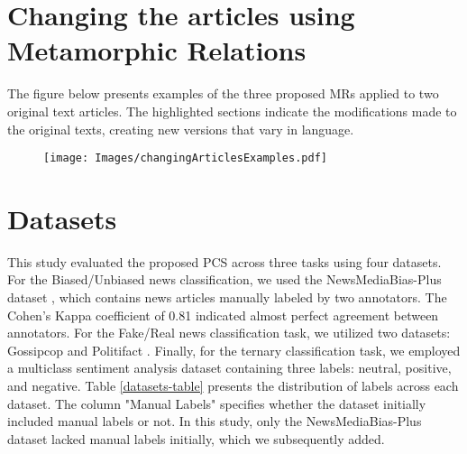 \newpage
\section{Changing the articles using Metamorphic Relations}
\label{fig:changing-articles}
The figure below presents examples of the three proposed MRs applied to two original text articles. The highlighted sections indicate the modifications made to the original texts, creating new versions that vary in language.

\begin{figure}[h]
  \texttt{[image: Images/changingArticlesExamples.pdf]} 

\end{figure}

\section{Datasets}
\label{datasets}
This study evaluated the proposed PCS across three tasks using four datasets. For the Biased/Unbiased news classification, we used the NewsMediaBias-Plus dataset \cite{vector_newsmediabias_plus}, which contains news articles manually labeled by two annotators. The Cohen's Kappa coefficient of 0.81 indicated almost perfect agreement between annotators. For the Fake/Real news classification task, we utilized two datasets: Gossipcop and Politifact \cite{shu2018fakenewsnet, shu2017fake, shu2017exploiting}. Finally, for the ternary classification task, we employed a multiclass sentiment analysis dataset \cite{hf_multiclass_sentiment} containing three labels: neutral, positive, and negative. Table \ref{datasets-table} presents the distribution of labels across each dataset. The column "Manual Labels" specifies whether the dataset initially included manual labels or not. In this study, only the NewsMediaBias-Plus dataset lacked manual labels initially, which we subsequently added.
